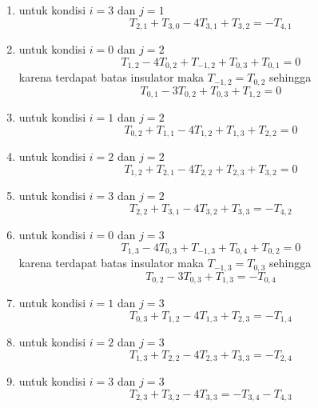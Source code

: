 \documentclass[a4paper,12pt]{article}
\numberwithin{equation}{section} %
\begin{document}
\begin{enumerate}
\item untuk kondisi $i = 3$ dan $j = 1$
\begin{equation}
T_{2,1} + T_{3,0} - 4T_{3,1} + T_{3,2} = - T_{4,1}
\end{equation}

\item untuk kondisi $i = 0$ dan $j = 2$
$$T_{1,2} - 4T_{0,2} + T_{-1,2} + T_{0,3} + T_{0,1} = 0$$
karena terdapat batas insulator maka $T_{-1,2} = T_{0,2}$ sehingga
\begin{equation}
T_{0,1} - 3T_{0,2} + T_{0,3} + T_{1,2} = 0
\end{equation}

\item untuk kondisi $i = 1$ dan $j = 2$
\begin{equation}
T_{0,2} + T_{1,1} - 4T_{1,2} + T_{1,3} + T_{2,2} =0
\end{equation}

\item untuk kondisi $i = 2$ dan $j = 2$
\begin{equation}
T_{1,2} + T_{2,1} - 4T_{2,2} + T_{2,3} + T_{3,2} =0
\end{equation}

\item untuk kondisi $i = 3$ dan $j = 2$
\begin{equation}
T_{2,2} + T_{3,1} - 4T_{3,2} + T_{3,3} = - T_{4,2}
\end{equation}

\item untuk kondisi $i = 0$ dan $j = 3$
$$T_{1,3} - 4T_{0,3} + T_{-1,3} + T_{0,4} + T_{0,2} = 0$$
karena terdapat batas insulator maka $T_{-1,3} = T_{0,3}$ sehingga
\begin{equation}
T_{0,2} - 3T_{0,3} + T_{1,3} = - T_{0,4}
\end{equation}

\item untuk kondisi $i = 1$ dan $j = 3$
\begin{equation}
T_{0,3} + T_{1,2} - 4T_{1,3} + T_{2,3} = - T_{1,4} 
\end{equation}

\item untuk kondisi $i = 2$ dan $j = 3$
\begin{equation}
T_{1,3} + T_{2,2} - 4T_{2,3} + T_{3,3} = - T_{2,4} 
\end{equation}

\item untuk kondisi $i = 3$ dan $j = 3$
\begin{equation}
T_{2,3} + T_{3,2} - 4T_{3,3} = - T_{3,4} - T_{4,3}
\end{equation}
\end{enumerate}
\end{document}

